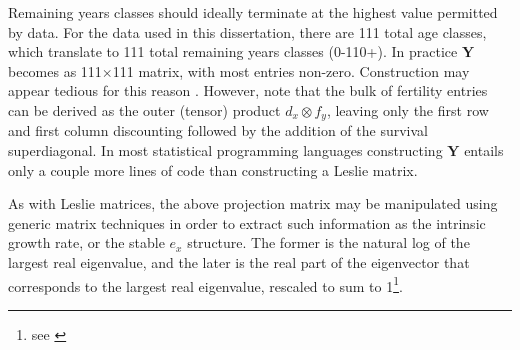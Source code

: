 Remaining years classes should ideally terminate at the highest value permitted
by data. For the data used in this dissertation, there are 111 total age
classes, which translate to 111 total remaining years classes (0-110+). In practice 
$\textbf{Y}$ becomes
as 111$\times$111 matrix, with most entries non-zero. Construction may appear
tedious for this reason . However, note that the bulk of fertility entries can
be derived as the outer (tensor) product $d_x \otimes f_y$, leaving only the 
first row and first column discounting followed by the addition of the survival
superdiagonal. In most statistical programming languages constructing $\textbf{Y}$ entails only
a couple more lines of code than constructing a Leslie matrix.

As with Leslie matrices, the above projection matrix may be manipulated using
generic matrix techniques in order to extract such information as the intrinsic
growth rate, or the stable $e_x$ structure. The former is the natural log of the
largest real eigenvalue, and the later is the real part of the eigenvector that
corresponds to the largest real eigenvalue, rescaled to sum to 1\footnote{see
\citet[pp 86-87]{caswell2001matrix}}.



